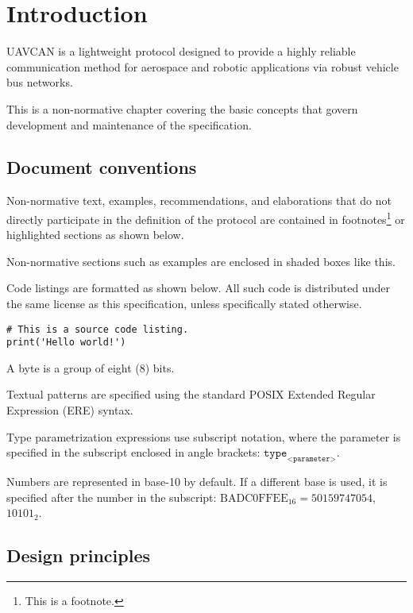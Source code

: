 \chapter{Introduction}\label{sec:introduction}

UAVCAN is a lightweight protocol designed to provide a highly reliable communication method for
aerospace and robotic applications via robust vehicle bus networks.

This is a non-normative chapter covering the basic concepts that govern development and maintenance of
the specification.

\section{Document conventions}

Non-normative text, examples, recommendations, and elaborations that do not directly participate
in the definition of the protocol are contained in footnotes\footnote{This is a footnote.}
or highlighted sections as shown below.

\begin{remark}
    Non-normative sections such as examples are enclosed in shaded boxes like this.
\end{remark}

Code listings are formatted as shown below.
All such code is distributed under the same license as this specification, unless specifically stated otherwise.

\begin{verbatim}
# This is a source code listing.
print('Hello world!')
\end{verbatim}

A byte is a group of eight (8) bits.

Textual patterns are specified using the standard
POSIX Extended Regular Expression (ERE) syntax.

Type parametrization expressions use subscript notation,
where the parameter is specified in the subscript enclosed in angle brackets:
$\texttt{type}_\texttt{<parameter>}$.

Numbers are represented in base-10 by default.
If a different base is used, it is specified after the number in the subscript:
$\text{BADC0FFEE}_{16} = 50159747054$, $10101_2$.

\section{Design principles}

